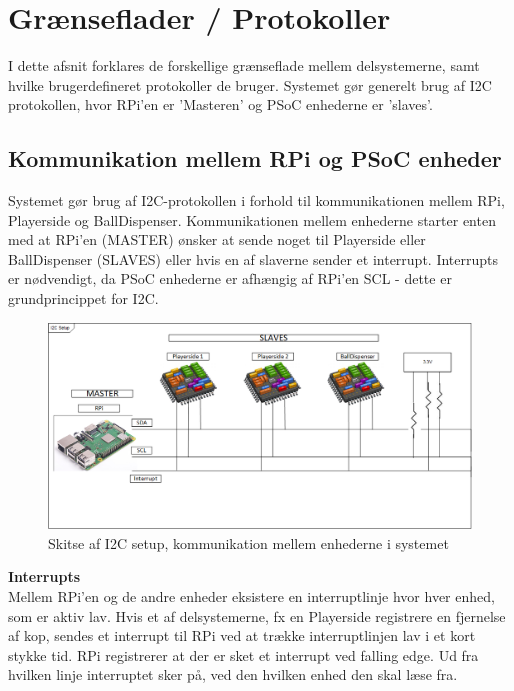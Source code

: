 \documentclass[Arkitektur/System_main.tex]{subfiles}
\begin{document}
\section{Grænseflader / Protokoller} \label{sec:protocols}
I dette afsnit forklares de forskellige grænseflade mellem delsystemerne, samt hvilke brugerdefineret protokoller de bruger. Systemet gør generelt brug af I2C protokollen, hvor RPi'en er 'Masteren' og PSoC enhederne er 'slaves'. 


\subsection{Kommunikation mellem RPi og PSoC enheder} \label{sec:RPi_PSoC_com}
Systemet gør brug af I2C-protokollen i forhold til kommunikationen mellem RPi, Playerside og BallDispenser. Kommunikationen mellem enhederne starter enten med at RPi'en (MASTER) ønsker at sende noget til Playerside eller BallDispenser (SLAVES) eller hvis en af slaverne sender et interrupt. Interrupts er nødvendigt, da PSoC enhederne er afhængig af RPi'en SCL - dette er grundprincippet for I2C. 

\begin{figure}[H]
    \centering
    \includegraphics[width=\textwidth]{Arkitektur/Grenseflader/Graphics/I2C.png}
    \caption{Skitse af I2C setup, kommunikation mellem enhederne i systemet}
    \label{fig:i2c_setup}
\end{figure}

\textbf{Interrupts}
\\Mellem RPi'en og de andre enheder eksistere en interruptlinje hvor hver enhed, som er aktiv lav. Hvis et af delsystemerne, fx en Playerside registrere en fjernelse af kop, sendes et interrupt til RPi ved at trække interruptlinjen lav i et kort stykke tid. RPi registrerer at der er sket et interrupt ved falling edge. Ud fra hvilken linje interruptet sker på, ved den hvilken enhed den skal læse fra. 
\end{document}
